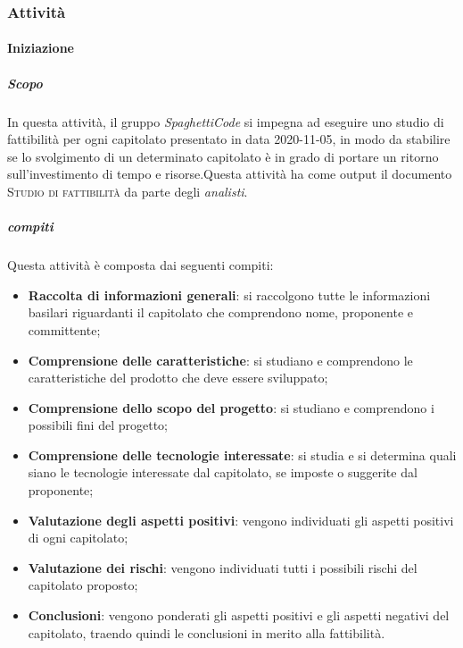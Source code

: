 \subsubsection{Attività}

\paragraph{Iniziazione}
\label{par:iniziazione}
\subparagraph{Scopo}
\label{par:iniziazione:scopo}
In questa attività, il gruppo \emph{SpaghettiCode} si impegna ad eseguire uno studio di fattibilità per ogni capitolato presentato in data 2020-11-05, in modo da stabilire se lo svolgimento di un determinato capitolato è in grado di portare un ritorno sull'investimento di tempo e risorse.Questa attività ha come output il documento \textsc{Studio di fattibilità} da parte degli \emph{analisti}.\\
\subparagraph{compiti}
\label{par:iniziazione:compiti}
Questa attività è composta dai seguenti compiti:
\begin{itemize}
    \item \textbf{Raccolta di informazioni generali}: si raccolgono tutte le informazioni basilari riguardanti il
    capitolato che comprendono nome, proponente e committente;
    \item \textbf{Comprensione delle caratteristiche}: si studiano e comprendono le caratteristiche del prodotto che
    deve essere sviluppato;
    \item \textbf{Comprensione dello scopo del progetto}: si studiano e comprendono i possibili fini del progetto;
    \item \textbf{Comprensione delle tecnologie interessate}: si studia e si determina quali siano le tecnologie
    interessate dal capitolato, se imposte o suggerite dal proponente;
    \item \textbf{Valutazione degli aspetti positivi}: vengono individuati gli aspetti positivi di ogni capitolato;
    \item \textbf{Valutazione dei rischi}: vengono individuati tutti i possibili rischi del capitolato proposto;
    \item \textbf{Conclusioni}: vengono ponderati gli aspetti positivi e gli aspetti negativi del capitolato, traendo
        quindi le conclusioni in merito alla fattibilità.
\end{itemize}


